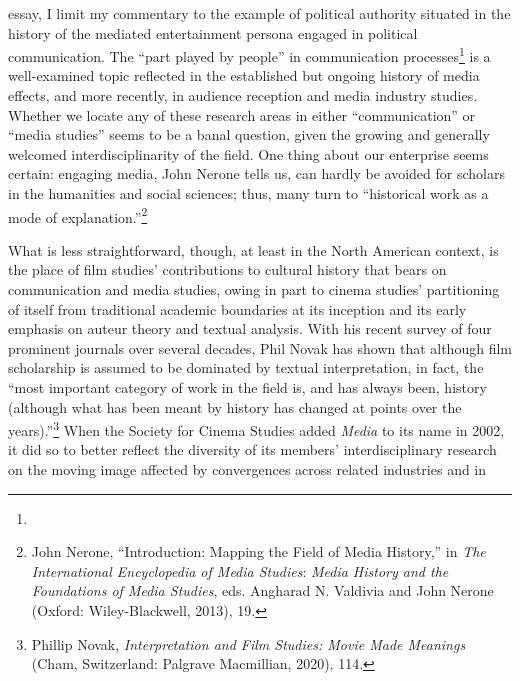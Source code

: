 \documentclass{tufte-handout}
\begin{document}
\begin{titlepage}
 essay, I limit my commentary to the example of political
authority situated in the history of the mediated entertainment persona
engaged in political communication. The ``part played by people'' in
communication processes\footnote{} is a well-examined topic reflected in
the established but ongoing history of media effects, and more recently,
in audience reception and media industry studies. Whether we locate any
of these research areas in either ``communication'' or ``media studies''
seems to be a banal question, given the growing and generally welcomed
interdisciplinarity of the field. One thing about our enterprise seems
certain: engaging media, John Nerone tells us, can hardly be avoided for
scholars in the humanities and social sciences; thus, many turn to
``historical work as a mode of explanation.''\footnote{John Nerone,
  ``Introduction: Mapping the Field of Media History,'' in \emph{The
  International Encyclopedia of Media Studies}: \emph{Media History and
  the Foundations of Media Studies}, eds. Angharad N. Valdivia and John
  Nerone (Oxford: Wiley-Blackwell, 2013), 19.}

What is less straightforward, though, at least in the North American
context, is the place of film studies' contributions to cultural history
that bears on communication and media studies, owing in part to cinema
studies' partitioning of itself from traditional academic boundaries at
its inception and its early emphasis on auteur theory and textual
analysis. With his recent survey of four prominent journals over several
decades, Phil Novak has shown that although film scholarship is assumed
to be dominated by textual interpretation, in fact, the ``most important
category of work in the field is, and has always been, history (although
what has been meant by history has changed at points over the
years).''\footnote{Phillip Novak, \emph{Interpretation and Film Studies:
  Movie Made Meanings} (Cham, Switzerland: Palgrave Macmillian, 2020),
  114.} When the Society for Cinema Studies added \emph{Media} to its
name in 2002, it did so to better reflect the diversity of its members'
interdisciplinary research on the moving image affected by convergences
across related industries and in

\enlargethispage{2\baselineskip}

\vspace*{2em}





 \end{titlepage}
\end{document}
